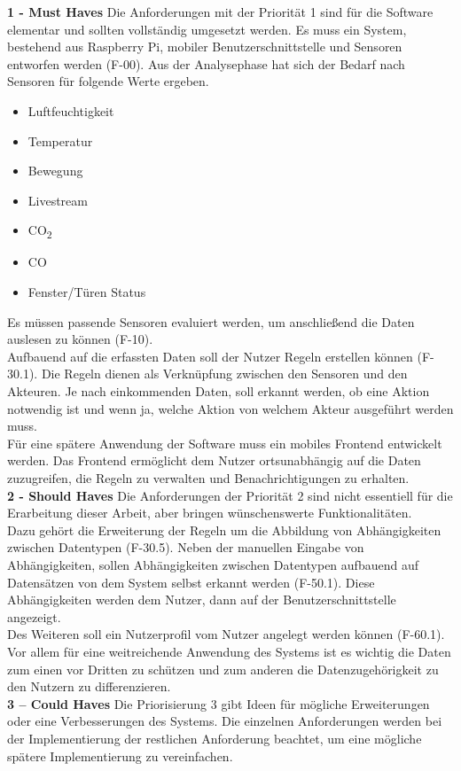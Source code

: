 \textbf{1 - Must Haves}
Die Anforderungen mit der Priorität 1 sind für die Software elementar und sollten vollständig umgesetzt werden. 
Es muss ein System, bestehend aus Raspberry Pi, mobiler Benutzerschnittstelle und Sensoren entworfen werden (F-00). Aus der Analysephase hat sich der Bedarf nach Sensoren für folgende Werte ergeben.
\begin{itemize}
\item Luftfeuchtigkeit
\item Temperatur
\item Bewegung
\item Livestream
\item CO\textsubscript{2}
\item CO
\item Fenster/Türen Status
\end{itemize}
Es müssen passende Sensoren evaluiert werden, um anschließend die Daten auslesen zu können (F-10).\\
Aufbauend auf die erfassten Daten soll der Nutzer Regeln erstellen können (F-30.1). Die Regeln dienen als Verknüpfung zwischen den Sensoren und den Akteuren. Je nach einkommenden Daten, soll erkannt werden, ob eine Aktion notwendig ist und wenn ja, welche Aktion von welchem Akteur ausgeführt werden muss.\\
Für eine spätere Anwendung der Software muss ein mobiles Frontend entwickelt werden. Das Frontend ermöglicht dem Nutzer ortsunabhängig auf die Daten zuzugreifen, die Regeln zu verwalten und Benachrichtigungen zu erhalten.\\
\textbf{2 - Should Haves}
Die Anforderungen der Priorität 2 sind nicht essentiell für die Erarbeitung dieser Arbeit, aber bringen wünschenswerte Funktionalitäten.\\
Dazu gehört die Erweiterung der Regeln um die Abbildung von Abhängigkeiten zwischen Datentypen (F-30.5). Neben der manuellen Eingabe von Abhängigkeiten, sollen Abhängigkeiten zwischen Datentypen aufbauend auf Datensätzen von dem System selbst erkannt werden (F-50.1). Diese Abhängigkeiten werden dem Nutzer, dann auf der Benutzerschnittstelle angezeigt.\\
Des Weiteren soll ein Nutzerprofil vom Nutzer angelegt werden können (F-60.1). Vor allem für eine weitreichende Anwendung des Systems ist es wichtig die Daten zum einen vor Dritten zu schützen und zum anderen die Datenzugehörigkeit zu den Nutzern zu differenzieren.\\
\textbf{3 – Could Haves}
Die Priorisierung 3 gibt Ideen für mögliche Erweiterungen oder eine Verbesserungen des Systems. Die einzelnen Anforderungen werden bei der Implementierung der restlichen Anforderung beachtet, um eine mögliche spätere Implementierung zu vereinfachen.\\
